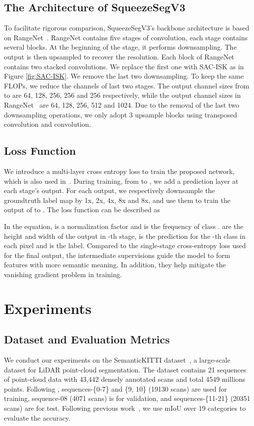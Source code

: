 \documentclass[runningheads]{llncs}
\begin{document}
\subsection{The Architecture of SqueezeSegV3}
To facilitate rigorous comparison, SqueezeSegV3's backbone architecture is based on RangeNet~\cite{milioto2019rangenet++}. RangeNet contains five stages of convolution, each stage contains several blocks. At the beginning of the stage, it performs downsampling. The output is then upsampled to recover the resolution. Each block of RangeNet contains two stacked convolutions. We replace the first one with SAC-ISK as in Figure \ref{fig:SAC-ISK}. We remove the last two downsampling. To keep the same FLOPs, we reduce the channels of last two stages. The output channel sizes from  to  are 64, 128, 256, 256 and 256 respectively, while the output channel sizes in RangeNet~\cite{milioto2019rangenet++} are 64, 128, 256, 512 and 1024. Due to the removal of the last two downsampling operations, we only adopt 3 upsample blocks using transposed convolution and convolution. 


\subsection{Loss Function}

We introduce a multi-layer cross entropy loss to train the proposed network, which is also used in~\cite{shen2017multi,johnson2016perceptual,xu2019learn,newell2016stacked}. During training, from  to , we add a prediction layer at each stage's output. For each output, we respectively downsample the groundtruth label map by 1x, 2x, 4x, 8x and 8x, and use them to train the output of  to . The loss function can be described as

In the equation,  is a normalization factor and  is the frequency of class .  are the height and width of the output in -th stage,  is the prediction for the -th class in each pixel and  is the label. Compared to the single-stage cross-entropy loss used for the final output, the intermediate supervisions guide the model to form features with more semantic meaning. In addition, they help mitigate the vanishing gradient problem in training.


\section{Experiments}
\subsection{Dataset and Evaluation Metrics}
We conduct our experiments on the SemanticKITTI dataset~\cite{behley2019iccv}, a large-scale dataset for LiDAR point-cloud segmentation. The dataset contains 21 sequences of point-cloud data with 43,442 densely annotated scans and total 4549 millions points. Following \cite{behley2019iccv}, sequences-\{0-7\} and \{9, 10\} (19130 scans) are used for training, sequence-08 (4071 scans) is for validation, and sequences-\{11-21\} (20351 scans) are for test. Following previous work~\cite{milioto2019rangenet++}, we use mIoU over 19 categories to evaluate the accuracy.
\end{document}
